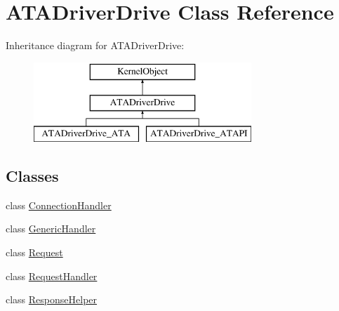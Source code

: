 \hypertarget{class_a_t_a_driver_drive}{}\section{A\+T\+A\+Driver\+Drive Class Reference}
\label{class_a_t_a_driver_drive}
Inheritance diagram for A\+T\+A\+Driver\+Drive\+:\begin{figure}[H]
\begin{center}
\leavevmode
\includegraphics[height=3.000000cm]{class_a_t_a_driver_drive}
\end{center}
\end{figure}
\subsection*{Classes}
\begin{DoxyCompactItemize}
\item 
class \hyperlink{class_a_t_a_driver_drive_1_1_connection_handler}{Connection\+Handler}
\item 
class \hyperlink{class_a_t_a_driver_drive_1_1_generic_handler}{Generic\+Handler}
\item 
class \hyperlink{class_a_t_a_driver_drive_1_1_request}{Request}
\item 
class \hyperlink{class_a_t_a_driver_drive_1_1_request_handler}{Request\+Handler}
\item 
class \hyperlink{class_a_t_a_driver_drive_1_1_response_helper}{Response\+Helper}
\end{DoxyCompactItemize}
